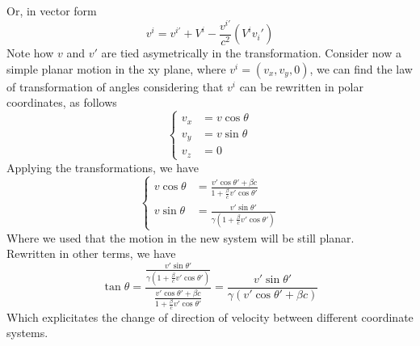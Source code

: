 \documentclass[../electromagnetism.tex]{subfiles}
\begin{document}
Or, in vector form
\begin{equation}
	v^i=v^{i'}+V^i-\frac{v^{i'}}{c^2}(V^iv_i')
	\label{eq:vectorform}
\end{equation}
Note how $v$ and $v'$ are tied asymetrically in the transformation. Consider now a simple planar motion in the xy plane, where $v^i=(v_x,v_y,0)$, we can find the law of transformation of angles considering that $v^i$ can be rewritten in polar coordinates, as follows
\begin{equation*}
	\left\{\begin{aligned}
		v_x&=v\cos\theta\\
		v_y&=v\sin\theta\\
		v_z&=0
	\end{aligned}\right.
\end{equation*}
Applying the transformations, we have
\begin{equation}
	\left\{\begin{aligned}
			v\cos\theta&=\frac{v'\cos\theta'+\beta c}{1+\frac{\beta}{c}v'\cos\theta'}\\
			v\sin\theta&=\frac{v'\sin\theta'}{\gamma\left( 1+\frac{\beta}{c}v'\cos\theta' \right)}
	\end{aligned}\right.
	\label{eq:angletrvel}
\end{equation}
Where we used that the motion in the new system will be still planar.\\
Rewritten in other terms, we have
\begin{equation}
	\tan\theta=\frac{\frac{v'\sin\theta'}{\gamma\left( 1+\frac{\beta}{c}v'\cos\theta' \right)}}{\frac{v'\cos\theta'+\beta c}{1+\frac{\beta}{c}v'\cos\theta'}}=\frac{v'\sin\theta'}{\gamma\left( v'\cos\theta'+\beta c \right)}
	\label{eq:tantr}
\end{equation}
Which explicitates the change of direction of velocity between different coordinate systems.
\end{document}
